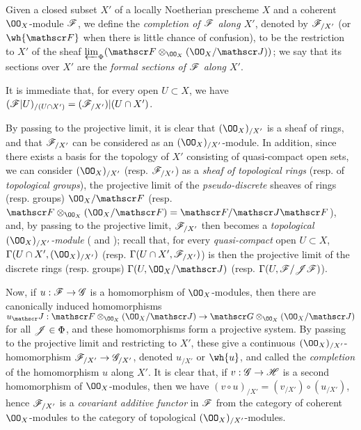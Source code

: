 \begin{defn}[10.8.4]
\label{1.10.8.4}
Given a closed subset $X'$ of a locally Noetherian prescheme $X$ and a coherent $\OO_X$-module $\mathscr{F}$, we define the \emph{completion of $\mathscr{F}$ along $X'$}, denoted by $\mathscr{F}_{/X'}$ (or $\wh{\sh{F}}$ when there is little chance of confusion), to be the restriction to $X'$ of the sheaf
$\varprojlim_\Phi(\sh{F}\otimes_{\OO_X}(\OO_X/\sh{J}))$; we say that its sections over $X'$ are the \emph{formal sections of $\mathscr{F}$ along $X'$}.
\end{defn}

It is immediate that, for every open $U\subset X$, we have $(\mathscr{F}|U)_{/(U\cap X')}=(\mathscr{F}_{/X'})|(U\cap X')$.

By passing to the projective limit, it is clear that $(\OO_X)_{/X'}$ is a sheaf of rings, and that $\mathscr{F}_{/X'}$ can be considered as an $(\OO_X)_{/X'}$-module.
In addition, since there exists a basis for the topology of $X'$ consisting of quasi-compact open sets, we can consider $(\OO_X)_{/X'}$ (resp. $\mathscr{F}_{/X'}$) as a \emph{sheaf of topological rings} (resp. of \emph{topological groups}), the projective limit of the \emph{pseudo-discrete} sheaves of rings (resp. groups) $\OO_X/\sh{F}$ (resp. $\sh{F}\otimes_{\OO_X}(\OO_X/\sh{F})=\sh{F}/\sh{J}\sh{F}$), and, by passing to the projective limit, $\mathscr{F}_{/X'}$ then becomes a \emph{topological $(\OO_X)_{/X'}$-module} ( and ); recall that, for every \emph{quasi-compact} open $U\subset X$, $\Gamma(U\cap X',(\OO_X)_{/X'})$ (resp. $\Gamma(U\cap X',\mathscr{F}_{/X'})$) is then the projective limit of the discrete rings (resp. groups) $\Gamma(U,\OO_X/\sh{J})$ (resp. $\Gamma(U,\mathscr{F}/\mathscr{J}\mathscr{F})$).

Now, if $u:\sh{F}\to\sh{G}$ is a homomorphism of $\OO_X$-modules, then there are canonically induced homomorphisms $u_\sh{J}:\sh{F}\otimes_{\OO_X}(\OO_X/\sh{J})\to\sh{G}\otimes_{\OO_X}(\OO_X/\sh{J})$ for all $\mathscr{J}\in\Phi$, and these homomorphisms form a projective system.
By passing to the projective limit and restricting to $X'$, these give a continuous $(\OO_X)_{/X'}$-homomorphism $\sh{F}_{/X'}\to\sh{G}_{/X'}$, denoted $u_{/X'}$ or $\wh{u}$, and called the \emph{completion} of the homomorphism $u$ along $X'$.
It is clear that, if $v:\sh{G}\to\sh{H}$ is a second homomorphism of $\OO_X$-modules, then we have $(v\circ u)_{/X'}=(v_{/X'})\circ(u_{/X'})$, hence $\mathscr{F}_{/X'}$ is a \emph{covariant additive functor} in $\mathscr{F}$ from the category of coherent $\OO_X$-modules to the category of topological $(\OO_X)_{/X'}$-modules.

